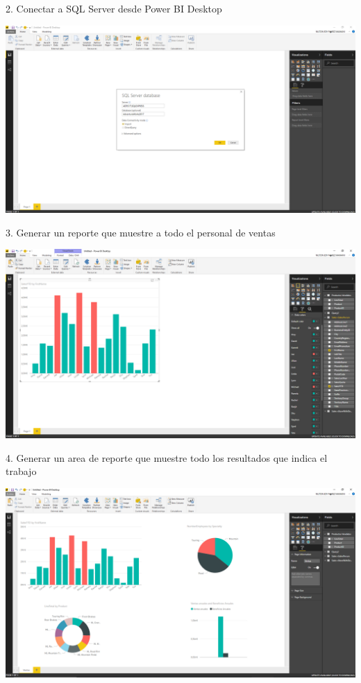 \begin{itemize}
2. Conectar a SQL Server desde Power BI Desktop 
\end{itemize} 

\begin{center}
\includegraphics[width=15cm]{./Imagenes/imagen2} 
\end{center}

\begin{itemize}
3. Generar un reporte que muestre a todo el personal de ventas 
\end{itemize} 

\begin{center}
\includegraphics[width=15cm]{./Imagenes/imagen3} 
\end{center}

\begin{itemize}
4. Generar un area de reporte que muestre todo los resultados que indica el trabajo
\end{itemize} 

\begin{center}
\includegraphics[width=15cm]{./Imagenes/imagen4} 
\end{center}

